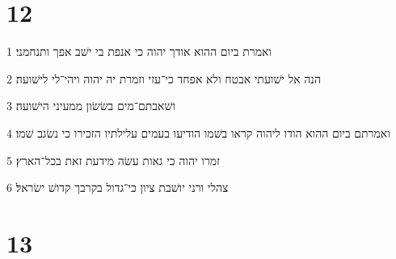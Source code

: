 \chapter{12}

\par 1 ואמרת ביום ההוא אודך יהוה כי אנפת בי ישׁב אפך ותנחמני׃
\par 2 הנה אל ישׁועתי אבטח ולא אפחד כי־עזי וזמרת יה יהוה ויהי־לי לישׁועה׃
\par 3 ושׁאבתם־מים בשׂשׂון ממעיני הישׁועה׃
\par 4 ואמרתם ביום ההוא הודו ליהוה קראו בשׁמו הודיעו בעמים עלילתיו הזכירו כי נשׂגב שׁמו׃
\par 5 זמרו יהוה כי גאות עשׂה מידעת זאת בכל־הארץ׃
\par 6 צהלי ורני יושׁבת ציון כי־גדול בקרבך קדושׁ ישׂראל׃

\chapter{13}

